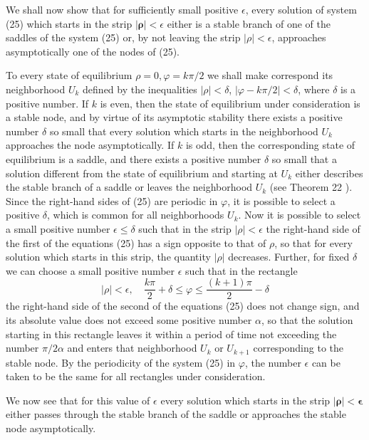 \documentclass[10pt,a5paper]{book}
\theoremstyle{plain}
\theoremstyle{definition}
\theoremstyle{remark}
\begin{document}
We shall now show that for sufficiently small positive $\epsilon$, every solution of system (25) which starts in the strip $|\boldsymbol{\rho}|<\epsilon$ either is a stable branch of one of the saddles of the system (25) or, by not leaving the strip $|\rho|<\epsilon$, approaches asymptotically one of the nodes of (25).

To every state of equilibrium $\rho=0, \varphi=k \pi / 2$ we shall make correspond its neighborhood $U_{k}$ defined by the inequalities $|\rho|<\delta$, $|\varphi-k \pi / 2|<\delta$, where $\delta$ is a positive number. If $k$ is even, then the state of equilibrium under consideration is a stable node, and by virtue of its asymptotic stability there exists a positive number $\delta$ so small that every solution which starts in the neighborhood $U_{k}$ approaches the node asymptotically. If $k$ is odd, then the corresponding state of equilibrium is a saddle, and there exists a positive number $\delta$ so small that a solution different from the state of equilibrium and starting at $U_{k}$ either describes the stable branch of a saddle or leaves the neighborhood $U_{k}$ (see Theorem 22 ). Since the right-hand sides of (25) are periodic in $\varphi$, it is possible to select a positive $\delta$, which is common for all neighborhoods $U_{k}$. Now it is possible to select a small positive number $\epsilon \leq \delta$ such that in the strip $|\rho|<\epsilon$ the right-hand side of the first of the equations (25) has a sign opposite to that of $\rho$, so that for every solution which starts in this strip, the quantity $|\rho|$ decreases. Further, for fixed $\delta$ we can choose a small positive number $\epsilon$ such that in the rectangle
\[
|\rho|<\epsilon, \quad \frac{k \pi}{2}+\delta \leq \varphi \leq \frac{(k+1) \pi}{2}-\delta
\]
the right-hand side of the second of the equations (25) does not change sign, and its absolute value does not exceed some positive number $\alpha$, so that the solution starting in this rectangle leaves it within a period of time not exceeding the number $\pi / 2 \alpha$ and enters that neighborhood $U_{k}$ or $U_{k+1}$ corresponding to the stable node. By the periodicity of the system (25) in $\varphi$, the number $\epsilon$ can be taken to be the same for all rectangles under consideration.

We now see that for this value of $\epsilon$ every solution which starts in the strip $|\boldsymbol{\rho}|<\boldsymbol{\epsilon}$ either passes through the stable branch of the saddle or approaches the stable node asymptotically.
\end{document}
